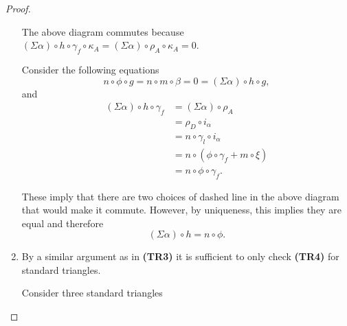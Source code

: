 \begin{proof}
\begin{enumerate}[label={(\bfseries TR\arabic*)}]
{\begin{center}
            \end{center}
            The above diagram commutes because \( (\Sigma \alpha) \circ h \circ \gamma_f \circ \kappa_A = (\Sigma \alpha) \circ \rho_A \circ \kappa_A = 0 \).

            Consider the following equations
            \[
                n \circ \phi \circ g = n \circ m \circ \beta = 0 = (\Sigma \alpha) \circ h \circ g,
            \]
            and
            \begin{align*}
                (\Sigma \alpha) \circ h \circ \gamma_f &= (\Sigma \alpha) \circ \rho_A \\
                &= \rho_{D} \circ i_{\alpha} \\
                &= n \circ \gamma_{l} \circ i_{\alpha} \\
                &= n \circ (\phi \circ \gamma_f + m \circ \xi) \\
                &= n \circ \phi \circ \gamma_f.
            \end{align*}
                
            These imply that there are two choices of dashed line in the above diagram that would make it commute. However, by uniqueness, this implies they are equal and therefore
            \[
                (\Sigma \alpha) \circ h = n \circ \phi.
            \]
        }
        \item {
            By a similar argument as in {\bf (TR3)} it is sufficient to only check {\bf (TR4)} for standard triangles.

            Consider three standard triangles
            \begin{center}
\end{center}}
\end{enumerate}
\end{proof}
